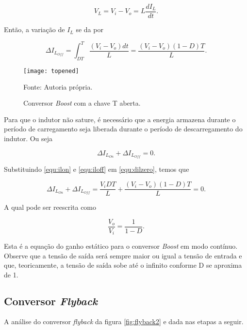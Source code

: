     \[
        V_L = V_i-V_o = L\frac{dI_L}{dt}.
    \]

    Então, a variação de $I_L$ se da por

    
    \begin{equation}
        \Delta I_{L_{Off}}=\int_{DT}^{T}\frac{\left(V_i-V_o\right) dt}{L}=\frac{\left(V_i-V_o\right) \left(1-D\right) T}{L}.
        \label{equ:iloff}
    \end{equation}
    

\begin{figure}[H]
    \centering
    \caption{Conversor \textit{Boost} com a chave T aberta.}
    \texttt{[image: topened]}
    \label{fig:opened}
    
    \small Fonte: Autoria própria.
\end{figure}

    Para que o indutor não sature, é necessário que a energia armazena durante o período de carregamento seja liberada durante o período de descarregamento do indutor. Ou seja

    
    \begin{equation}
        \Delta I_{L_{On}} + \Delta I_{L_{Off}}=0.
        \label{equ:dilzero}
    \end{equation}
    
    
    Substituindo \ref{equ:ilon} e \ref{equ:iloff} em \ref{equ:dilzero}, temos que
    
    \[
        \Delta I_{L_{On}} + \Delta I_{L_{Off}}=\frac{V_i D T}{L}+\frac{\left(V_i-V_o\right)\left(1-D\right)T}{L}=0.
    \]

    A qual pode ser reescrita como
    
    \begin{equation}
        \frac{V_o}{V_i}=\frac{1}{1-D}.
        \label{equ:ganho}
    \end{equation}
    
    Esta é a equação do ganho estático para o conversor \textit{Boost} em modo contínuo. Observe que a tensão de saída será sempre maior ou igual a tensão de entrada e que, teoricamente, a tensão de saída sobe até o infinito conforme D se aproxima de 1.
    
    \subsection{Conversor \textit{Flyback}}
    A análise do conversor \textit{flyback} da figura \ref{fig:flyback2} e dada nas etapas a seguir.
    
